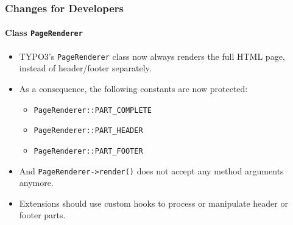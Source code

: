 %

\begin{frame}[fragile]
	\frametitle{Changes for Developers}
	\framesubtitle{Class \texttt{PageRenderer}}

	\begin{itemize}
		\item TYPO3's \small\texttt{PageRenderer}\normalsize
			class now always renders the full HTML page, instead of
			header/footer separately.

		\item As a consequence, the following constants are now protected:

			\begin{itemize}\small
				\item \texttt{PageRenderer::PART\_COMPLETE}
				\item \texttt{PageRenderer::PART\_HEADER}
				\item \texttt{PageRenderer::PART\_FOOTER}
			\end{itemize}

		\item And \texttt{PageRenderer->render()} does not accept any method
			arguments anymore.

		\item Extensions should use custom hooks to process or manipulate header
			or footer parts.

	\end{itemize}
\end{frame}

